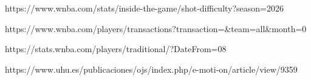 https://www.wnba.com/stats/inside-the-game/shot-difficulty?season=2026

https://www.wnba.com/players/transactions?transaction=&team=all&month=0

https://stats.wnba.com/players/traditional/?DateFrom=08%


https://www.uhu.es/publicaciones/ojs/index.php/e-moti-on/article/view/9359